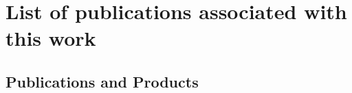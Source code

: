 \documentclass[letterpaper]{article}
\begin{document}
\FloatBarrier

\section{List of publications associated with this work}



\subsection{Publications and Products}
\end{document}
